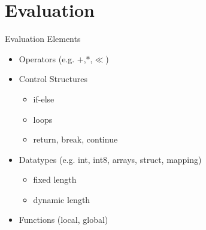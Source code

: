 \documentclass[11pt]{beamer}
\begin{document}
\section{Evaluation}
\begin{frame}{Evaluation Elements}
    \begin{itemize}
        \item<1-> Operators (e.g. $+$,$*$,$\ll$)
        \item<2-> Control Structures
            \begin{itemize}
                \item if-else
                \item loops
                \item return, break, continue
            \end{itemize}
        \item<3-> Datatypes (e.g. int, int8, arrays, struct, mapping)
            \begin{itemize}
                \item fixed length
                \item dynamic length
            \end{itemize}
        \item<4-> Functions (local, global)
    \end{itemize}
\end{frame}
\end{document}
